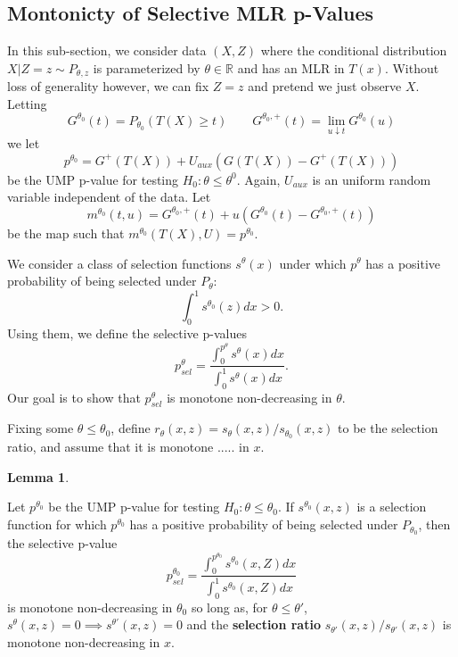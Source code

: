 \documentclass{article}
\newtheorem{lemma}{Lemma}
\newcommand{\R}{\mathbb{R}}
\begin{document}
\begin{appendix}
\subsection{Montonicty of Selective MLR p-Values}

In this sub-section, we consider data $(X, Z)$ where the conditional distribution $X | Z= z \sim P_{\theta, z}$ is parameterized by $\theta \in \R$ and has an MLR in $T(x)$. Without loss of generality however, we can fix $Z = z$ and pretend we just observe $X$. Letting
\begin{equation*}
    G^{\theta_0}(t ) = P_{\theta_0}(T(X) \geq t) \qquad G^{\theta_0, +}(t) = \lim_{u \downarrow t} G^{\theta_0}(u)
\end{equation*}
we let 
\begin{equation*}
    p^{\theta_0} = G^{+}(T(X)) + U_{aux}(G(T(X)) - G^{+}(T(X)))
\end{equation*}
be the UMP p-value for testing $H_{0}: \theta \leq \theta^{0}$. Again, $U_{aux}$ is an uniform random variable independent of the data. Let 
\begin{equation*}
    m^{\theta_0}(t, u) = G^{\theta_0, +}(t) + u(G^{\theta_0}(t) - G^{\theta_0, +}(t))
\end{equation*}
be the map such that $m^{\theta_0}(T(X), U) = p^{\theta_0}$. 

We consider a class of selection functions $s^{\theta}(x)$ under which $p^{\theta}$ has a positive probability of being selected under $P_{\theta}$:
\begin{equation*}
    \int_0^1 s^{\theta_0}(z) dx > 0. 
\end{equation*}
Using them, we define the selective p-values 
\begin{equation*}
    p^{\theta}_{sel} = \frac{\int_{0}^{p^{\theta}} s^{\theta}(x) dx}{\int_{0}^{1} s^{\theta}(x) dx}.
\end{equation*}
Our goal is to show that $p^{\theta}_{sel}$ is monotone non-decreasing in $\theta$.

Fixing some $\theta \leq \theta_0$, define $r_{\theta}(x, z) = s_{\theta}(x, z)/s_{\theta_0}(x, z)$ to be the selection ratio, and assume that it is monotone ..... in $x$. 

\begin{lemma}
    
\end{lemma}



Let $p^{\theta_0}$ be the UMP p-value for testing $H_0: \theta \leq \theta_0$. If $s^{\theta_0}(x, z)$ is a selection function for which $p^{\theta_0}$ has a positive probability of being selected under $P_{\theta_0}$, then the selective p-value 
    \begin{equation*}
        p_{sel}^{\theta_0} = \frac{\int_0^{p^{\theta_0}} s^{\theta_0}(x, Z)  dx}{ \int_0^1 s^{\theta_0}(x, Z) dx}
    \end{equation*}
    is monotone non-decreasing in $\theta_0$ so long as, for $\theta \leq \theta'$, $s^{\theta}(x, z) = 0 \implies s^{\theta'}(x, z) = 0$ and the \textbf{selection ratio} $s_{\theta'}(x, z)/s_{\theta'}(x, z)$ is monotone non-decreasing in $x$. 


\end{appendix}
\end{document}
